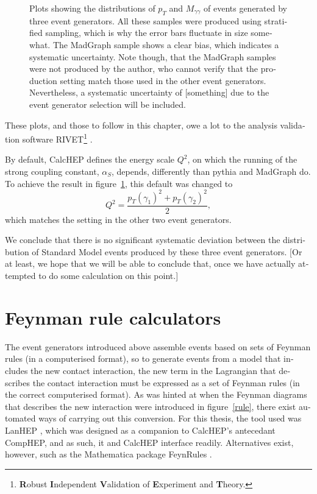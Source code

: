 \begin{english}
\begin{figure}[hbtp]
\begin{minipage}[b]{.3\textwidth}
\phantom{p}
\end{minipage}
\caption{Plots showing the distributions of $p_T$ and $M_{\gamma\gamma}$ of events generated by three event generators. All these samples were produced using stratified sampling, which is why the error bars fluctuate in size somewhat. The MadGraph sample shows a clear bias, which indicates a systematic uncertainty. Note though, that the MadGraph samples were not produced by the author, who cannot verify that the production setting match those used in the other event generators. Nevertheless, a systematic uncertainty of [something] due to the event generator selection will be included.
\label{evgen}}
\end{figure}

These plots, and those to follow in this chapter, owe a lot to the analysis validation software RIVET\footnote{\textbf{R}obust \textbf{I}ndependent \textbf{V}alidation of \textbf{E}xperiment and \textbf{T}heory.} \cite{rivet}.

By default, CalcHEP defines the energy scale $Q^2$, on which the running of the strong coupling constant, $\alpha_S$, depends, differently than pythia and MadGraph do. To achieve the result in figure~\ref{evgen}, this default was changed to 
\[Q^2=\frac{p_T(\gamma_1)^2+p_T(\gamma_2)^2}{2},\]
which matches the setting in the other two event generators.

We conclude that there is no significant systematic deviation between the distribution of Standard Model events produced by these three event generators. [Or at least, we hope that we will be able to conclude that, once we have actually attempted to do some calculation on this point.]

\section{Feynman rule calculators}
The event generators introduced above assemble events based on sets of Feynman rules (in a computerised format), so to generate events from a model that includes the new contact interaction, the new term in the Lagrangian that describes the contact interaction must be expressed as a set of Feynman rules (in the correct computerised format). As was hinted at when the Feynman diagrams that describes the new interaction were introduced in figure~\ref{rule}, there exist automated ways of carrying out this conversion. For this thesis, the tool used was LanHEP \cite{lanhep}, which was designed as a companion to CalcHEP's antecedant CompHEP, and as such, it and CalcHEP interface readily. Alternatives exist, however, such as the Mathematica package FeynRules \cite{feynrules}. 


\end{english}

